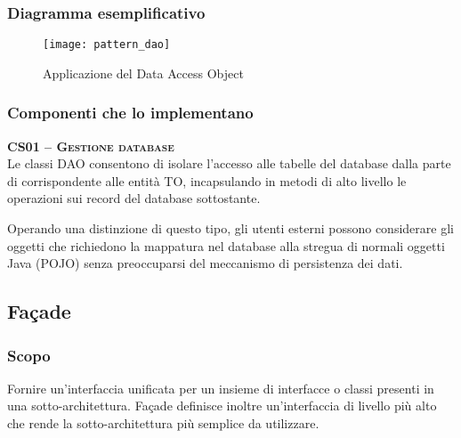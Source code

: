 \subsubsection{Diagramma esemplificativo}
  \begin{figure}[H]
  \centering
  \texttt{[image: pattern\_dao]}
  \caption{Applicazione del  Data Access Object}\label{fig:dao}
\end{figure}

\subsubsection{Componenti che lo implementano}
\begin{description}
\item{\scshape\bfseries CS01 -- Gestione database}\\
Le classi DAO consentono di isolare l'accesso alle tabelle del database dalla parte di  corrispondente alle entità TO, incapsulando in metodi di alto livello le operazioni sui record del database sottostante.

Operando una distinzione di questo tipo, gli utenti esterni possono considerare gli oggetti che richiedono la mappatura nel database alla stregua di normali oggetti Java (POJO) senza preoccuparsi del meccanismo di persistenza dei dati.
\end{description}

\subsection{Façade}

\subsubsection{Scopo}
Fornire un'interfaccia unificata per un insieme di interfacce o classi presenti in una sotto-architettura. Façade definisce inoltre un'interfaccia di livello più alto che rende la sotto-architettura più semplice da utilizzare.


